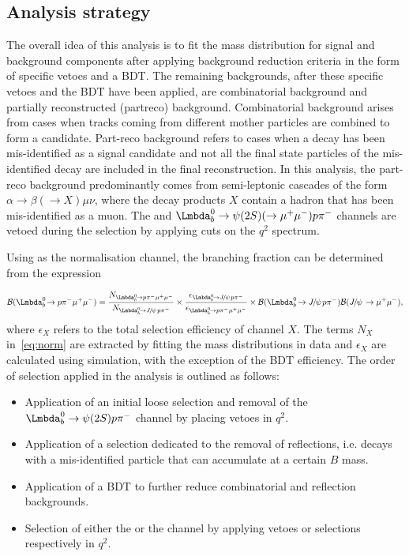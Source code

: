 \subsection{Analysis strategy}
\label{sec:ana}
The overall idea of this analysis is to fit the \Lb mass distribution for signal and background components after applying background reduction criteria in the form of specific vetoes and a BDT. The remaining backgrounds, after these specific vetoes and the BDT have been applied, are combinatorial background and partially reconstructed (\gls{partreco}) background. Combinatorial background arises from cases when tracks coming from different mother particles are combined to form a candidate. Part-reco background refers to cases when a decay has been mis-identified as a signal candidate and not all the final state particles of the mis-identified decay are included in the final reconstruction. In this analysis, the part-reco background predominantly comes from semi-leptonic  cascades of the form $\alpha\to\beta(\to X)\mu\nu$, where the decay products $X$ contain a hadron that has been mis-identified as a muon. The \Lbpijpsi and $\Lb\to\psi(2S)(\to\mumu)\proton\pim$ channels are vetoed during the \Lbpi selection by applying cuts on the $q^{2}$ spectrum.

Using \Lbpijpsi as the normalisation channel,  the \Lbpi branching fraction can be determined from the expression

\begin{equation}
  \BF(\Lbpi) = \frac{N_{\Lbpi}}{N_{\Lbpijpsi}}\times\frac{\epsilon_{\Lbpijpsi}}{\epsilon_{\Lbpi}}\times \BF(\Lbpijpsi)\BF(\jpsi\to\mumu),
  \label{eq:norm}
  \end{equation}
where $\epsilon_{X}$ refers to the total selection efficiency of channel $X$. The terms $N_{X}$ in~\autoref{eq:norm} are extracted by fitting the \Lb mass distributions in data and $\epsilon_{X}$ are calculated using simulation, with the exception of the BDT efficiency. The order of selection applied in the analysis is outlined as follows:
\begin{itemize}
  \item Application of an initial loose selection and removal of the $\Lb\to\psi(2S)\proton\pim$ channel by placing vetoes in $q^{2}$.
  \item Application of a selection dedicated to the removal of \gls{reflections}, i.e. decays with a mis-identified particle that can accumulate at a certain $B$ mass.
  \item Application of a BDT to further reduce combinatorial and reflection backgrounds.
    \item Selection of either the \Lbpi or the \Lbpijpsi channel by applying vetoes or selections respectively in $q^{2}$.
\end{itemize}

